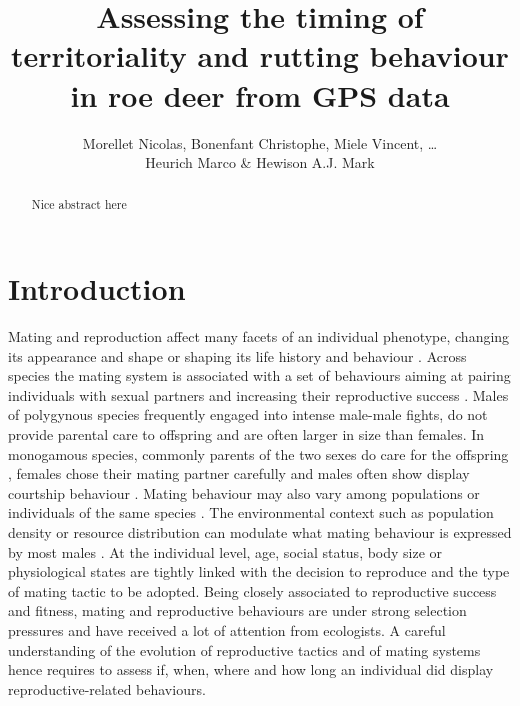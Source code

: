 \documentclass[a4paper,11pt]{article}
\title{Assessing the timing of territoriality and rutting behaviour in
  roe deer from GPS data}
\author{Morellet Nicolas, Bonenfant Christophe, Miele Vincent,
  \ldots\\ Heurich Marco \& Hewison A.J. Mark}
\begin{document}
\maketitle

\newpage
\begin{abstract}
Nice abstract here
\end{abstract}

\newpage
\section*{Introduction}

Mating and reproduction affect many facets of an individual phenotype,
changing its appearance and shape or shaping its life history and
behaviour \citep{Darwin1871}. Across species the mating system is
associated with a set of behaviours aiming at pairing individuals with
sexual partners and increasing their reproductive success
\citep{emlen_ecology_1977,Clutton-Brock1989a,Wittenberger1979}. Males of
polygynous species frequently engaged into intense male-male fights,
do not provide parental care to offspring and are often larger in size
than females. In monogamous species, commonly parents of the two sexes do care
for the offspring \citep{lukas_evolution_2013}, females chose their mating partner carefully and males often show display courtship behaviour \citep{boogert_mate_2011}. Mating behaviour may also vary among populations or individuals of the same species \citep{Lott1991,Dunbar1982}. The environmental context such as
population density or resource distribution can modulate what mating
behaviour is expressed by most males \citep{verner_influence_1966, carranza_territoriality_1990}. At the individual level, age, social status, body size
or physiological states are tightly linked with the decision to
reproduce and the type of mating tactic to be adopted. Being closely
associated to reproductive success and fitness, mating and
reproductive behaviours are under strong selection pressures and have
received a lot of attention from ecologists. A careful understanding
of the evolution of reproductive tactics and of mating systems hence
requires to assess if, when, where and how long an individual did
display reproductive-related behaviours.
\end{document}
